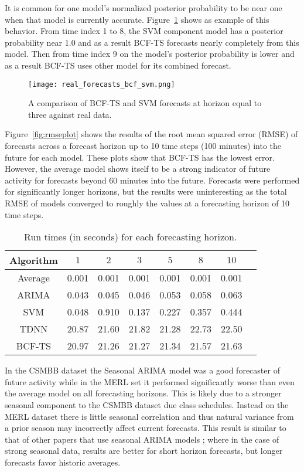 It is common for one model's normalized posterior probability to be near one when that model is currently accurate.  Figure~\ref{fig:realbcfsvm} shows as example of this behavior.  From time index 1 to 8, the SVM component model has a posterior probability near 1.0 and as a result BCF-TS forecasts nearly completely from this model.  Then from time index 9 on the model's posterior probability is lower and as a result BCF-TS uses other model for its combined forecast.

\begin{figure}[h]
\centering
\texttt{[image: real\_forecasts\_bcf\_svm.png]}
\caption{A comparison of BCF-TS and SVM forecasts at horizon equal to three against real data.}
\label{fig:realbcfsvm}
\end{figure}

Figure~\ref{fig:rmseplot} shows the results of the root mean squared error (RMSE) of forecasts across a forecast horizon up to 10 time steps (100 minutes) into the future for each model.  These plots show that BCF-TS has the lowest error.  However, the average model shows itself to be a strong indicator of future activity for forecasts beyond 60 minutes into the future.  Forecasts were performed for significantly longer horizons, but the results were uninteresting as the total RMSE of models converged to roughly the values at a forecasting horizon of 10 time steps.  

\begin{table}
\centering
\caption{Run times (in seconds) for each forecasting horizon.}
\begin{tabular}{|c|c|c|c|c|c|c|c|} \hline
Algorithm & $1$ & $2$ & $3$ & $5$ & $8$ & $10$ \\ \hline
Average & 0.001 & 0.001 & 0.001 & 0.001 & 0.001 & 0.001 \\ \hline
ARIMA & 0.043 & 0.045 & 0.046 & 0.053 & 0.058 & 0.063\\ \hline
SVM & 0.048 & 0.910 & 0.137 & 0.227 & 0.357 & 0.444 \\ \hline
TDNN & 20.87 & 21.60 & 21.82 & 21.28 & 22.73 & 22.50 \\ \hline
BCF-TS & 20.97 & 21.26 & 21.27 & 21.34 & 21.57 & 21.63\\ \hline
\end{tabular}
\label{fig:runtimestab}
\end{table}

In the CSMBB dataset the Seasonal ARIMA model was a good forecaster of future activity while in the MERL set it performed significantly worse than even the average model on all forecasting horizons.  This is likely due to a stronger seasonal component to the CSMBB dataset due class schedules.  Instead on the MERL dataset there is little seasonal correlation and thus natural variance from a prior season may incorrectly affect current forecasts.  This result is similar to that of other papers that use seasonal ARIMA models \cite{Newsham2010}; where in the case of strong seasonal data, results are better for short horizon forecasts, but longer forecasts favor historic averages.

